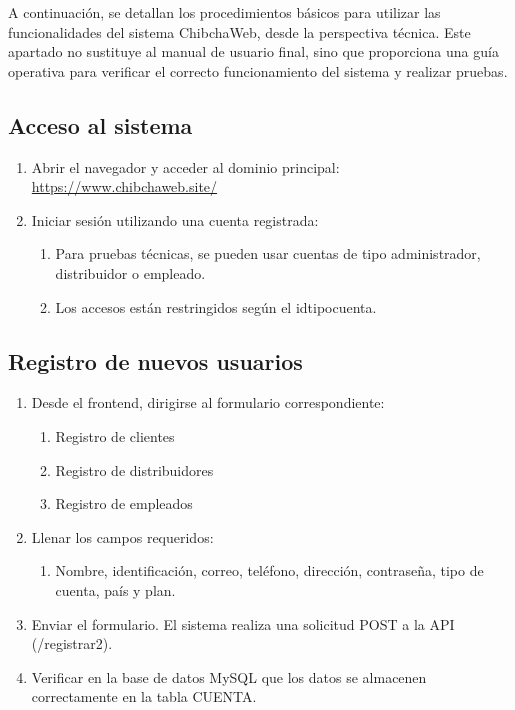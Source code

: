 A continuación, se detallan los procedimientos básicos para utilizar las funcionalidades del sistema ChibchaWeb, desde la perspectiva técnica. Este apartado no sustituye al manual de usuario final, sino que proporciona una guía operativa para verificar el correcto funcionamiento del sistema y realizar pruebas.

\subsection{Acceso al sistema}
\begin{enumerate}
    \item Abrir el navegador y acceder al dominio principal: \href{https://www.chibchaweb.site/ }{https://www.chibchaweb.site/}
    \item Iniciar sesión utilizando una cuenta registrada:
    \begin{enumerate}
        \item Para pruebas técnicas, se pueden usar cuentas de tipo administrador, distribuidor o empleado. 
        \item Los accesos están restringidos según el idtipocuenta.
    \end{enumerate}
\end{enumerate}

\subsection{Registro de nuevos usuarios}
\begin{enumerate}
    \item Desde el frontend, dirigirse al formulario correspondiente: 
    \begin{enumerate}
        \item Registro de clientes 
        \item Registro de distribuidores
        \item Registro de empleados
    \end{enumerate}
    \item Llenar los campos requeridos: 
    \begin{enumerate}
        \item Nombre, identificación, correo, teléfono, dirección, contraseña, tipo de cuenta, país y plan. 
    \end{enumerate} 
    \item Enviar el formulario. El sistema realiza una solicitud POST a la API (/registrar2). 
    \item Verificar en la base de datos MySQL que los datos se almacenen correctamente en la tabla CUENTA. 
\end{enumerate}

